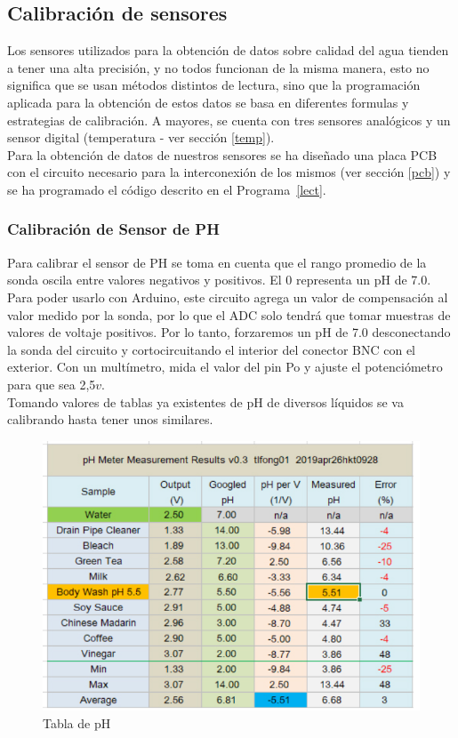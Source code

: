 \documentclass[10pt,a4paper]{article}
\begin{document}
\subsection{Calibración de sensores }
Los sensores utilizados para la obtención de datos sobre calidad del agua tienden a tener una alta precisión, y no todos funcionan de la misma manera, esto no significa que se usan métodos distintos de lectura, sino que la programación aplicada para la obtención de estos datos se basa en diferentes formulas y estrategias de calibración. A mayores, se cuenta con tres sensores analógicos y un sensor digital (temperatura - ver sección \ref{temp}).\\

Para la obtención de datos de nuestros sensores se ha diseñado una placa PCB con el circuito necesario para la interconexión de los mismos (ver sección \ref{pcb}) y se ha programado el código descrito en el Programa~\ref{lect}.


\subsubsection{Calibración de Sensor de PH}
Para calibrar el sensor de PH  se toma en cuenta que el rango promedio de la sonda oscila entre valores negativos y positivos. El 0 representa un pH de 7.0. Para poder usarlo con Arduino, este circuito agrega un valor de compensación al valor medido por la sonda, por lo que el ADC solo tendrá que tomar muestras de valores de voltaje positivos. Por lo tanto, forzaremos un pH de 7.0 desconectando la sonda del circuito y cortocircuitando el interior del conector BNC con el exterior. Con un multímetro, mida el valor del  pin Po  y ajuste el potenciómetro para que sea 2,5$v$.\\

Tomando valores de tablas ya existentes de pH de diversos líquidos se va calibrando hasta tener unos similares.
\begin{figure}[H]
\centering
\includegraphics[scale=0.8]{tablaPH.PNG}
\caption{Tabla de pH}
\label{tabPH}
\end{figure}
\end{document}
